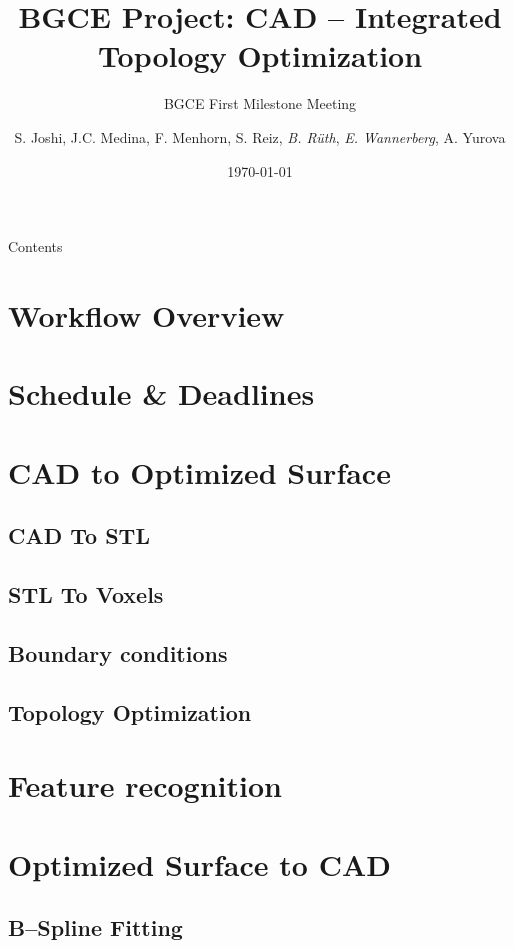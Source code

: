 \documentclass[9pt,pdftex]{beamer}
\title{BGCE Project: CAD -- Integrated Topology Optimization}
\subtitle{BGCE First Milestone Meeting}
\author[E. Wannerberg, B. Rüth] {S. Joshi, J.C. Medina, F. Menhorn, S. Reiz, \textit{B. Rüth}, \textit{E. Wannerberg}, A. Yurova} %
\date{\today}
\institute{Technische Universität München}
\begin{document}
\titlepage
\begin{frame}{Contents}
\tableofcontents
\end{frame}
\section{Workflow Overview}

\section{Schedule \& Deadlines}

\section{CAD to Optimized Surface}


\subsection{CAD To STL}



\subsection{STL To Voxels}



\subsection{Boundary conditions}



\subsection{Topology Optimization}



\section{Feature recognition}



\section{Optimized Surface to CAD}

\subsection{B--Spline Fitting}

\end{document}
